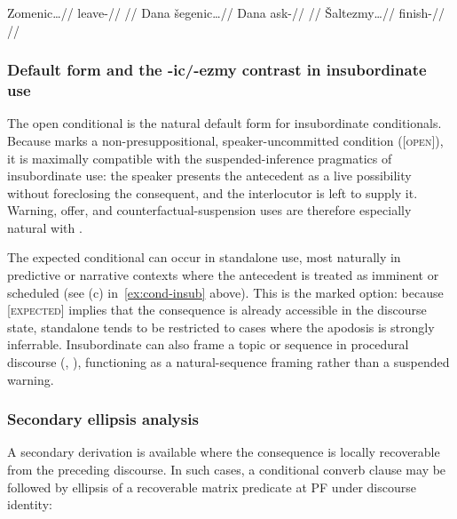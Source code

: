 \pex \label{ex:cond-insub}
\a
\begingl
\gla Zomenic\ldots//
\glb leave-\Cond{}//
\glft {} //
\endgl
\a
\begingl
\gla Dana šegenic\ldots//
\glb Dana ask-\Cond{}//
\glft {} //
\endgl
\a
\begingl
\gla Šaltezmy\ldots//
\glb finish-\ECond{}//
\glft {} //
\endgl
\xe

\subsubsection{Default form and the -ic/-ezmy contrast in insubordinate use}

The open conditional  is the natural default form for insubordinate
conditionals. Because  marks a non-presuppositional,
speaker-uncommitted condition ([\textsc{open}]), it is maximally compatible with
the suspended-inference pragmatics of insubordinate use: the speaker presents
the antecedent as a live possibility without foreclosing the consequent, and the
interlocutor is left to supply it. Warning, offer, and counterfactual-suspension
uses are therefore especially natural with .

The expected conditional  can occur in standalone use, most naturally
in predictive or narrative contexts where the antecedent is treated as imminent
or scheduled (see (c) in~\ref{ex:cond-insub} above). This is the marked option:
because [\textsc{expected}] implies that the consequence is already accessible
in the discourse state, standalone  tends to be restricted to cases
where the apodosis is strongly inferrable. Insubordinate  can also
frame a topic or sequence in procedural discourse (, ), functioning as a
natural-sequence framing rather than a suspended warning.

\subsubsection{Secondary ellipsis analysis}

A secondary derivation is available where the consequence is locally recoverable
from the preceding discourse. In such cases, a conditional converb clause may be
followed by ellipsis of a recoverable matrix predicate at PF under discourse
identity:


